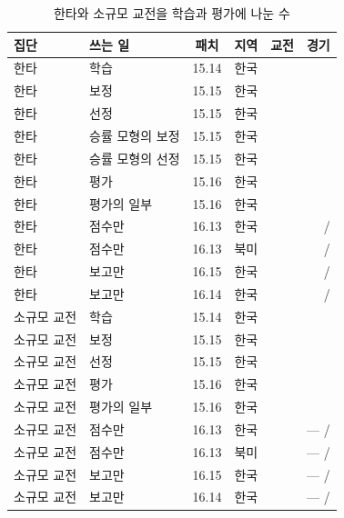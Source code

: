 \begin{table}[!t]
  \centering
  \caption{한타와 소규모 교전을 학습과 평가에 나눈 수}
  \label{tab:roles-engagement}
  \footnotesize
  \begin{tabular}{@{}llccrr@{}}
    \toprule
    집단 & 쓰는 일 & 패치 & 지역 & 교전 & 경기 \\
    \midrule
    한타 & 학습 & 15.14 & 한국 & \numTTrain{} & \numTTrainMatches{} \\
    한타 & 보정 & 15.15 & 한국 & \numTQcal{} & \numTQcalMatches{} \\
    한타 & 선정 & 15.15 & 한국 & \numTQsel{} & \numTQselMatches{} \\
    한타 & 승률 모형의 보정 & 15.15 & 한국 & \numTVcal{} & \numTVcalMatches{} \\
    한타 & 승률 모형의 선정 & 15.15 & 한국 & \numTVsel{} & \numTVselMatches{} \\
    한타 & 평가 & 15.16 & 한국 & \numTTest{} & \numTTestMatches{} \\
    한타 & 평가의 일부 & 15.16 & 한국 & \numTBforty{} & \numTBfortyMatches{} \\
    한타 & 점수만 & 16.13 & 한국 & \numTExtKR{} & \numTExtKRMatches{} / \numExtKRCollected{} \\
    한타 & 점수만 & 16.13 & 북미 & \numTExtNA{} & \numTExtNAMatches{} / \numExtNACollected{} \\
    한타 & 보고만 & 16.15 & 한국 & \numTExtKRb{} & \numTExtKRbMatches{} / \numExtKRbCollected{} \\
    한타 & 보고만 & 16.14 & 한국 & \numTExtPilot{} & \numTExtPilotMatches{} / \numExtPilotCollected{} \\
    \midrule
    소규모 교전 & 학습 & 15.14 & 한국 & \numSTrain{} & \numSTrainMatches{} \\
    소규모 교전 & 보정 & 15.15 & 한국 & \numSQcal{} & \numSQcalMatches{} \\
    소규모 교전 & 선정 & 15.15 & 한국 & \numSQsel{} & \numSQselMatches{} \\
    소규모 교전 & 평가 & 15.16 & 한국 & \numSTest{} & \numSTestMatches{} \\
    소규모 교전 & 평가의 일부 & 15.16 & 한국 & \numSBforty{} & \numSBfortyMatches{} \\
    소규모 교전 & 점수만 & 16.13 & 한국 & \numSExtKR{} & --- / \numExtKRCollected{} \\
    소규모 교전 & 점수만 & 16.13 & 북미 & \numSExtNA{} & --- / \numExtNACollected{} \\
    소규모 교전 & 보고만 & 16.15 & 한국 & \numSExtKRb{} & --- / \numExtKRbCollected{} \\
    소규모 교전 & 보고만 & 16.14 & 한국 & \numSExtPilot{} & --- / \numExtPilotCollected{} \\
    \bottomrule
  \end{tabular}
\end{table}
